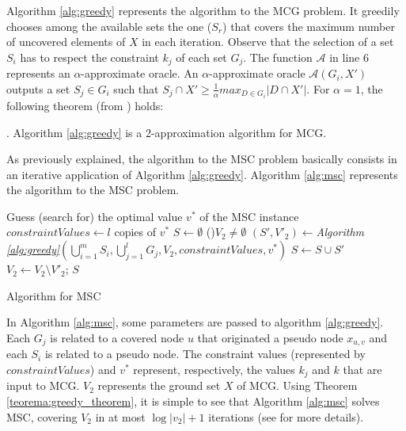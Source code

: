 Algorithm \ref{alg:greedy} represents the algorithm to the MCG problem. 
It greedily chooses among the available sets the one ($S_r$) that covers the maximum number of uncovered elements of $X$ in each iteration. 
Observe that the selection of a set $S_i$ has to respect the constraint $k_j$ of each set $G_j$. The function $\mathcal{A}$ in line 6 represents an 
$\alpha$-approximate oracle. An $\alpha$-approximate oracle $\mathcal{A}(G_i,X')$ outputs a set $S_j \in G_i$ such that $S_j \cap X' \ge \frac{1}{\alpha}max_{D \in G_i}|D \cap X'|$. 
For $\alpha = 1$, the following theorem (from \cite{Chekuri2004}) holds:

\begin{Theo}
  \label{teorema:greedy_theorem}
  \cite{Chekuri2004}. Algorithm \ref{alg:greedy} is a 2-approximation algorithm for MCG.
\end{Theo}

As previously explained, the algorithm to the MSC problem basically consists in an iterative application of Algorithm \ref{alg:greedy}. 
Algorithm \ref{alg:msc} represents the algorithm to the MSC problem.

\begin{algorithm}[t]
  Guess (search for) the optimal value $v^*$ of the MSC instance\;
  $constraintValues \gets l$ copies of $v^*$\;
  $S \gets \emptyset$\;
  \While(){$V_2 \neq \emptyset$} %
  {
    $(S',V'_2) \gets $\emph{Algorithm \ref{alg:greedy}}$(\bigcup_{i=1}^{m}S_i, \bigcup_{j=1}^{l}G_j, V_2, constraintValues, v^*)$\;
    $S \gets S \cup S'$\;
    $V_2 \gets V_2 \setminus V'_2$; 
  }
  \Return $S$\;
\caption{Algorithm for MSC \cite{Chekuri2004}} 
\label{alg:msc}
\end{algorithm}

In Algorithm \ref{alg:msc}, some parameters are passed to algorithm \ref{alg:greedy}. Each $G_j$ is related to a covered node $u$ that originated a pseudo node $x_{u,v}$ and each 
$S_i$ is related to a pseudo node. 
The constraint values (represented by $constraintValues$) and $v^*$ represent, respectively, the values $k_j$ and $k$ that are input to MCG. 
$V_2$ represents the ground set $X$ of MCG. Using Theorem \ref{teorema:greedy_theorem}, 
it is simple to see that Algorithm \ref{alg:msc} solves MSC, covering $V_2$ in at most $\log |v_2| + 1$ iterations (see \cite{Chekuri2004} for more details).

